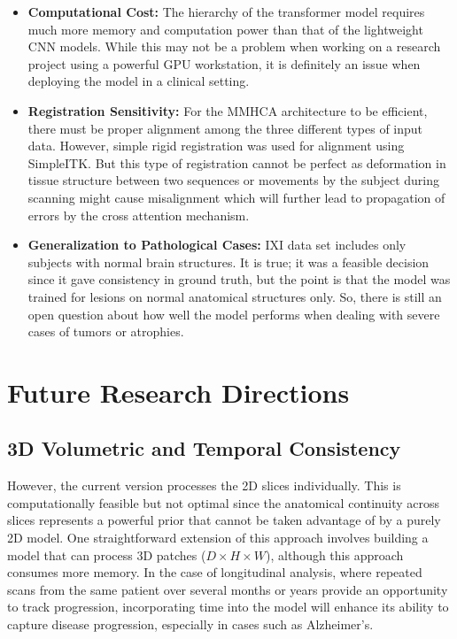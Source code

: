 \begin{itemize}
    \item \textbf{Computational Cost:} The hierarchy of the transformer model requires much more memory and computation power than that of the lightweight CNN models. While this may not be a problem when working on a research project using a powerful GPU workstation, it is definitely an issue when deploying the model in a clinical setting.

    \item \textbf{Registration Sensitivity:} For the MMHCA architecture to be efficient, there must be proper alignment among the three different types of input data. However, simple rigid registration was used for alignment using SimpleITK. But this type of registration cannot be perfect as deformation in tissue structure between two sequences or movements by the subject during scanning might cause misalignment which will further lead to propagation of errors by the cross attention mechanism.

    \item \textbf{Generalization to Pathological Cases:} IXI data set includes only subjects with normal brain structures. It is true; it was a feasible decision since it gave consistency in ground truth, but the point is that the model was trained for lesions on normal anatomical structures only. So, there is still an open question about how well the model performs when dealing with severe cases of tumors or atrophies.
\end{itemize}

\section{Future Research Directions}

\subsection{3D Volumetric and Temporal Consistency}
However, the current version processes the 2D slices individually. This is computationally feasible but not optimal since the anatomical continuity across slices represents a powerful prior that cannot be taken advantage of by a purely 2D model. One straightforward extension of this approach involves building a model that can process 3D patches ($D \times H \times W$), although this approach consumes more memory. In the case of longitudinal analysis, where repeated scans from the same patient over several months or years provide an opportunity to track progression, incorporating time into the model will enhance its ability to capture disease progression, especially in cases such as Alzheimer's.

